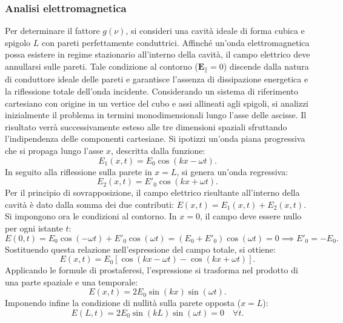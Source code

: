 \documentclass[a4paper,11pt]{report}
\begin{document}
\subsubsection{Analisi elettromagnetica}
Per determinare il fattore $g(\nu)$, si consideri una cavità ideale di forma cubica e spigolo $L$ con pareti perfettamente conduttrici.
Affinché un'onda elettromagnetica possa esistere in regime stazionario all'interno della cavità, il campo elettrico deve annullarsi sulle pareti. Tale condizione al contorno ($\bm{E}_{\parallel} = 0$) discende dalla natura di conduttore ideale delle pareti e garantisce l'assenza di dissipazione energetica e la riflessione totale dell'onda incidente.
Considerando un sistema di riferimento cartesiano con origine in un vertice del cubo e assi allineati agli spigoli, si analizzi inizialmente il problema in termini monodimensionali lungo l'asse delle ascisse. Il risultato verrà successivamente esteso alle tre dimensioni spaziali sfruttando l'indipendenza delle componenti cartesiane.
Si ipotizzi un'onda piana progressiva che si propaga lungo l'asse $x$, descritta dalla funzione:
\begin{equation}
E_1(x,t) = E_0 \cos(kx-\omega t).
\end{equation}
In seguito alla riflessione sulla parete in $x=L$, si genera un'onda regressiva:
\begin{equation}
E_2(x,t) = E'_0 \cos(kx+\omega t).
\end{equation}
Per il principio di sovrapposizione, il campo elettrico risultante all'interno della cavità è dato dalla somma dei due contributi: $E(x,t) = E_1(x,t) + E_2(x,t)$. Si impongono ora le condizioni al contorno.
In $x=0$, il campo deve essere nullo per ogni istante $t$:
\begin{equation}
E(0,t) = E_0 \cos(-\omega t) + E'_0 \cos(\omega t) = (E_0 + E'_0)\cos(\omega t) = 0 \implies E'_0 = -E_0.
\end{equation}
Sostituendo questa relazione nell'espressione del campo totale, si ottiene:
\begin{equation}
E(x,t) = E_0 [\cos(kx-\omega t) - \cos(kx+\omega t)].
\end{equation}
Applicando le formule di prostaferesi, l'espressione si trasforma nel prodotto di una parte spaziale e una temporale:
\begin{equation}
E(x,t) = 2E_0 \sin(kx)\sin(\omega t).
\label{eq:onda_stazionaria_1D}
\end{equation}
Imponendo infine la condizione di nullità sulla parete opposta ($x=L$):
\begin{equation}
E(L,t) = 2E_0 \sin(kL)\sin(\omega t) = 0 \quad \forall t.
\end{equation}
\end{document}
